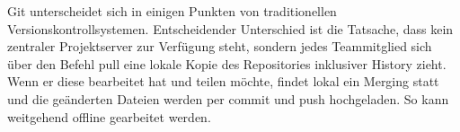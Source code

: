 Git unterscheidet sich in einigen Punkten von traditionellen Versionskontrollsystemen. Entscheidender Unterschied ist die Tatsache, dass kein zentraler Projektserver zur Verfügung steht, sondern jedes Teammitglied sich über den Befehl pull eine lokale Kopie des Repositories inklusiver History zieht. Wenn er diese bearbeitet hat und teilen möchte, findet lokal ein Merging  statt und die geänderten Dateien werden per commit und push hochgeladen. So kann weitgehend offline gearbeitet werden. 

\autorende{}
